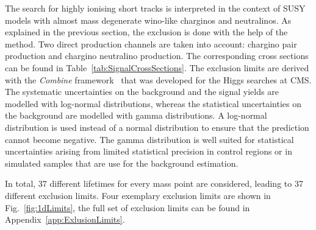 The search for highly ionising short tracks is interpreted in the context of SUSY models with almost mass degenerate wino-like charginos and neutralinos.
As explained in the previous section, the exclusion is done with the help of the \CLs method.
Two direct production channels are taken into account: chargino pair production and chargino neutralino production. 
The corresponding cross sections can be found in Table~\ref{tab:SignalCrossSections}.
The exclusion limits are derived with the \textit{Combine} framework~\cite{bib:CMS:Combine} that was developed for the Higgs searches at CMS.
The systematic uncertainties on the background and the signal yields  are modelled with log-normal distributions, whereas the statistical uncertainties on the background are modelled with gamma distributions.
A log-normal distribution is used instead of a normal distribution to ensure that the prediction cannot become negative.
The gamma distribution is well suited for statistical uncertainties arising from limited statistical precision in control regions or in simulated samples that are use for the background estimation.

In total, 37 different lifetimes for every mass point are considered, leading to 37 different exclusion limits.
Four exemplary exclusion limits are shown in Fig.~\ref{fig:1dLimits}, the full set of exclusion limits can be found in Appendix~\ref{app:ExlusionLimits}.

